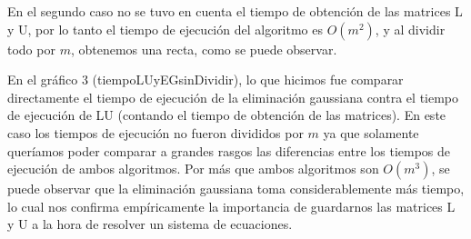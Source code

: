 \documentclass[a4paper]{article}
\begin{document}
En el segundo caso no se tuvo en cuenta el tiempo de obtención de las matrices L y U, por lo tanto el tiempo de ejecución del algoritmo es $O(m^{2})$, y al dividir todo por $m$, obtenemos una recta, como se puede observar.

En el gráfico 3 (tiempoLUyEGsinDividir), lo que hicimos fue comparar directamente el tiempo de ejecución de la eliminación gaussiana contra el tiempo de ejecución de LU (contando el tiempo de obtención de las matrices). En este caso los tiempos de ejecución no fueron divididos por $m$ ya que solamente queríamos poder comparar a grandes rasgos las diferencias entre los tiempos de ejecución de ambos algoritmos. Por más que ambos algoritmos son $O(m^{3})$, se puede observar que la eliminación gaussiana toma considerablemente más tiempo, lo cual nos confirma empíricamente la importancia de guardarnos las matrices L y U a la hora de resolver un sistema de ecuaciones.
\end{document}
